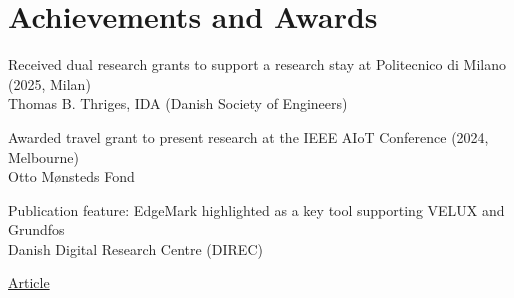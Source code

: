 
\section{Achievements and Awards}

    \begin{onecolentry}
        \begin{highlightsforbulletentries}

            \item Received dual research grants to support a research stay at Politecnico di Milano (2025, Milan)\\
            {\small Thomas B. Thriges, IDA (Danish Society of Engineers)}

            \item Awarded travel grant to present research at the IEEE AIoT Conference (2024, Melbourne)\\
            {\small Otto Mønsteds Fond}

        \end{highlightsforbulletentries}
    \end{onecolentry}

    \vspace{0.1 cm}

    \multicolentry{*, 2cm}
    {
        \begin{highlightsforbulletentries}

            \item Publication feature: EdgeMark highlighted as a key tool supporting VELUX and Grundfos\\
            {\small Danish Digital Research Centre (DIREC)}

        \end{highlightsforbulletentries}
    }
    {
        \href{https://direc.dk/direc-supports-velux-and-grundfos-in-the-race-for-smarter-ai/}{Article}
    }
    
    \vspace{0.1 cm}

